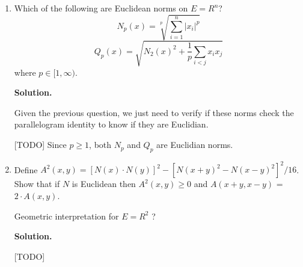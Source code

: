 \documentclass[12pt]{article}
\newcommand{\Z}{\mathbb{Z}}
\newcommand{\R}{\mathbb{R}}
\newcommand{\Q}{\mathbb{Q}}
\newcommand{\N}{\mathbb{N}}
\newenvironment{solution}{\vspace{0.2cm} \textbf{Solution.}}{}
\begin{document}
\begin{enumerate}[label=(\alph*)]
\begin{solution}
\begin{enumerate}[label={\roman*)}]
			By induction, we prove that this it is true for any power $n$ that:
			$$ \langle 2^n \cdot x, y \rangle = 2^n \cdot \langle x,y \rangle $$
			
			Taking $u = \frac{1}{2}(x+y)$ and $v = \frac{1}{2} (x-y)$, we have:
			$$ \langle x+y,z  \rangle = \langle 2 \cdot u,z \rangle = 2 \cdot \langle u, z\rangle = \langle u +v, z \rangle + \langle u-v, z \rangle = \langle x, z\rangle + \langle y,z \rangle$$.
			
			By induction we conclude that for any $n \in \N$ (we've seen that it's true for $n=0$), and any $x,y \in E$ we must have:
			$$\langle nx,y \rangle = n \langle x,y \rangle$$
			
			We can extend the linearity to $\Z$ using $\langle -x,y\rangle = - \langle x, y \rangle$, and then to $\Q$ using $\langle x,y \rangle = n \cdot \langle \frac{1}{n} x,y \rangle$.
			
			We conclude that the linearity is true over $\R$ using the well-known density of $\Q$ in $\R$ and the continuity of the application $(x,y) \mapsto \frac{1}{4} \cdot \left[ N(x+y)^2 - N(x-y)^2 \right]$, since the norm $N$ is continuous.
			
			Therefore, the linearity of $\langle \cdot, \cdot \rangle$ is true.
			
			Therefore $\langle \cdot, \cdot \rangle$ is an inner product over $E$ from which $N$ derives since $N(x) = \sqrt{\langle x,x \rangle}$.
			
			\underline{Conclusion:} $N$ is a Euclidian norm if and only if it checks the parallelogram identity.
			
		\end{enumerate}
		
		\end{solution}
		\item Which of the following are Euclidean norms on $E = R^n$?
		$$N_p (x) = \sqrt[p]{\sum_{i=1}^{n} |x_i|^p}$$
		$$Q_p (x) = \sqrt{N_2 (x)^2 + \frac{1}{p} \sum_{i < j} x_i x_j} $$
		where $p \in [1, \infty)$.
		
		\begin{solution}
		
		Given the previous question, we just need to verify if these norms check the parallelogram identity to know if they are Euclidian.
		
		[TODO] Since $p \geqslant 1$, both $N_p$ and $Q_p$ are Euclidian norms.
%			
		\end{solution}
		\item Define $A^2 (x, y) = [N(x) \cdot N(y)]^2 - [N(x + y)^2 - N(x - y)^2 ]^2 /16$. Show that if $N$ is Euclidean then
		$A^2 (x, y) \geq 0$ and $A(x + y, x - y)$ = $2 \cdot A(x, y)$.
		
		Geometric interpretation for $E = R^2$ ?
		
		\begin{solution}
		
		[TODO]
		
		\end{solution}
	\end{enumerate}
	
\end{document}
